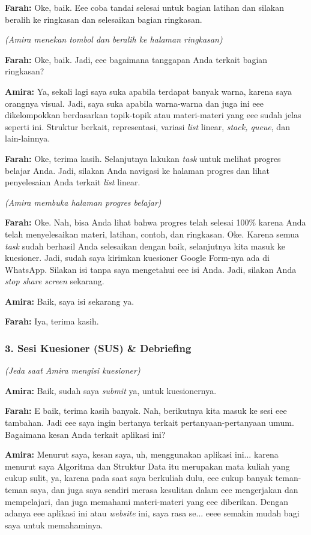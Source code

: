 \textbf{Farah:} Oke, baik. Eee coba tandai selesai untuk bagian latihan dan silakan beralih ke ringkasan dan selesaikan bagian ringkasan.

\textit{(Amira menekan tombol dan beralih ke halaman ringkasan)}

\textbf{Farah:} Oke, baik. Jadi, eee bagaimana tanggapan Anda terkait bagian ringkasan?

\textbf{Amira:} Ya, sekali lagi saya suka apabila terdapat banyak warna, karena saya orangnya visual. Jadi, saya suka apabila warna-warna dan juga ini eee dikelompokkan berdasarkan topik-topik atau materi-materi yang eee sudah jelas seperti ini. Struktur berkait, representasi, variasi \textit{list} linear, \textit{stack, queue}, dan lain-lainnya.

\textbf{Farah:} Oke, terima kasih. Selanjutnya lakukan \textit{task} untuk melihat progres belajar Anda. Jadi, silakan Anda navigasi ke halaman progres dan lihat penyelesaian Anda terkait \textit{list} linear.

\textit{(Amira membuka halaman progres belajar)}

\textbf{Farah:} Oke. Nah, bisa Anda lihat bahwa progres telah selesai 100\% karena Anda telah menyelesaikan materi, latihan, contoh, dan ringkasan. Oke. Karena semua \textit{task} sudah berhasil Anda selesaikan dengan baik, selanjutnya kita masuk ke kuesioner. Jadi, sudah saya kirimkan kuesioner Google Form-nya ada di WhatsApp. Silakan isi tanpa saya mengetahui eee isi Anda. Jadi, silakan Anda \textit{stop share screen} sekarang.

\textbf{Amira:} Baik, saya isi sekarang ya.

\textbf{Farah:} Iya, terima kasih.

\bigskip

\subsubsection*{3. Sesi Kuesioner (SUS) \& Debriefing}

\textit{(Jeda saat Amira mengisi kuesioner)}

\textbf{Amira:} Baik, sudah saya \textit{submit} ya, untuk kuesionernya.

\textbf{Farah:} E baik, terima kasih banyak. Nah, berikutnya kita masuk ke sesi eee tambahan. Jadi eee saya ingin bertanya terkait pertanyaan-pertanyaan umum. Bagaimana kesan Anda terkait aplikasi ini?

\textbf{Amira:} Menurut saya, kesan saya, uh, menggunakan aplikasi ini... karena menurut saya Algoritma dan Struktur Data itu merupakan mata kuliah yang cukup sulit, ya, karena pada saat saya berkuliah dulu, eee cukup banyak teman-teman saya, dan juga saya sendiri merasa kesulitan dalam eee mengerjakan dan mempelajari, dan juga memahami materi-materi yang eee diberikan. Dengan adanya eee aplikasi ini atau \textit{website} ini, saya rasa se... eeee semakin mudah bagi saya untuk memahaminya.

